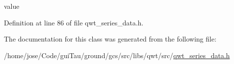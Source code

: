 value 



Definition at line 86 of file qwt\-\_\-series\-\_\-data.\-h.



The documentation for this class was generated from the following file\-:\begin{DoxyCompactItemize}
\item 
/home/jose/\-Code/gui\-Tau/ground/gcs/src/libs/qwt/src/\hyperlink{qwt__series__data_8h}{qwt\-\_\-series\-\_\-data.\-h}\end{DoxyCompactItemize}
